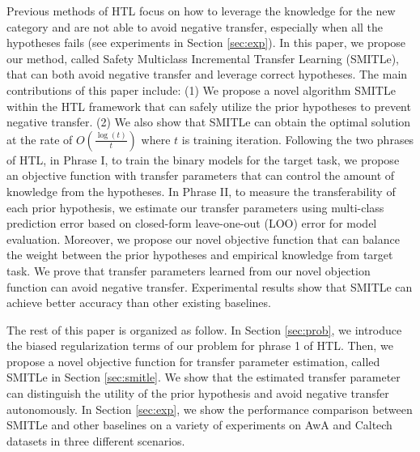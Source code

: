 Previous methods of HTL focus on how to leverage the knowledge for the new category and are not able to avoid negative transfer, especially when all the hypotheses fails (see experiments in Section \ref{sec:exp}).
In this paper, we propose our method, called Safety Multiclass Incremental Transfer Learning (SMITLe), that can both avoid negative transfer and leverage correct hypotheses. 
The main contributions of this paper include: (1) We propose a novel algorithm SMITLe within the HTL framework that can safely utilize the prior hypotheses to prevent negative transfer. (2) We also show that SMITLe can obtain the optimal solution at the rate of $O(\frac{\log(t)}{t})$ where $t$ is training iteration. 
Following the two phrases of HTL, in Phrase I, to train the binary models for the target task, we propose an objective function with transfer parameters that can control the amount of knowledge from the hypotheses. 
In Phrase II, to measure the transferability of each prior hypothesis, we estimate our transfer parameters using multi-class prediction error based on closed-form leave-one-out (LOO) error for model evaluation.
Moreover, we propose our novel objective function that can balance the weight between the prior hypotheses and empirical knowledge from target task. We prove that transfer parameters learned from our novel objection function can avoid negative transfer. Experimental results show that SMITLe can achieve better accuracy than other existing baselines.

The rest of this paper is organized as follow.
In Section \ref{sec:prob}, we introduce the biased regularization terms of our problem for phrase 1 of HTL. Then, we propose a novel objective function for transfer parameter estimation, called SMITLe in Section \ref{sec:smitle}. We show that the estimated transfer parameter can distinguish the utility of the prior hypothesis and avoid negative transfer autonomously. In Section \ref{sec:exp}, we show the performance comparison between SMITLe and other baselines on a variety of experiments on AwA and Caltech datasets in three different scenarios.
